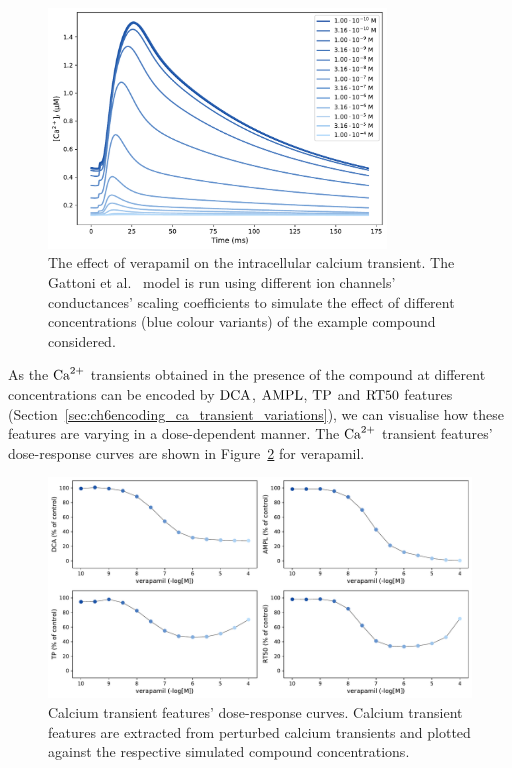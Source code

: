 \begin{figure}[ht!]
    \myfloatalign
    \includegraphics[width=0.8\textwidth]{figures/chapter06/verapamil_calcium_curve_drug.pdf}
    \caption{The effect of verapamil on the intracellular calcium transient. The Gattoni et al.~\cite{Gattoni:2017} model is run using different ion channels' conductances' scaling coefficients to simulate the effect of different concentrations (blue colour variants) of the example compound considered.}
    \label{fig:calciumverapamil}
\end{figure}

\vspace{0.2cm}
As the $\textrm{Ca}^{2+}$ transients obtained in the presence of the compound at different concentrations can be encoded by $\textrm{DCA}$, $\textrm{AMPL}$, $\textrm{TP}$ and $\textrm{RT50}$ features (Section~\ref{sec:ch6encoding_ca_transient_variations}), we can visualise how these features are varying in a dose-dependent manner. The $\textrm{Ca}^{2+}$ transient features' dose-response curves are shown in Figure~\ref{fig:cafeatsverapamilrespcurve} for verapamil.

\begin{figure}[ht!]
    \myfloatalign
    \includegraphics[width=\textwidth]{figures/chapter06/verapamil_dose_calcium_response_curve_drug.pdf}
    \caption{Calcium transient features' dose-response curves. Calcium transient features are extracted from perturbed calcium transients and plotted against the respective simulated compound concentrations.}
    \label{fig:cafeatsverapamilrespcurve}
\end{figure}

